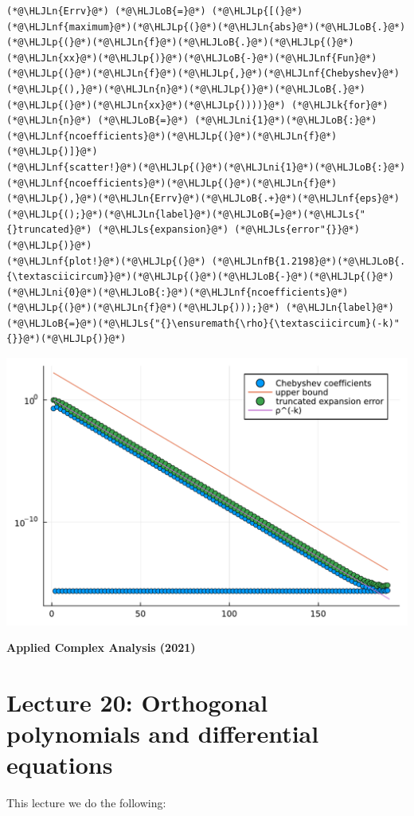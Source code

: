 \documentclass[12pt,a4paper]{article}
\newcommand{\HLJLk}[1]{\textcolor[RGB]{148,91,176}{\textbf{#1}}}
\newcommand{\HLJLn}[1]{#1}
\newcommand{\HLJLnf}[1]{\textcolor[RGB]{66,102,213}{#1}}
\newcommand{\HLJLs}[1]{\textcolor[RGB]{201,61,57}{#1}}
\newcommand{\HLJLnfB}[1]{\textcolor[RGB]{59,151,46}{#1}}
\newcommand{\HLJLni}[1]{\textcolor[RGB]{59,151,46}{#1}}
\newcommand{\HLJLoB}[1]{\textcolor[RGB]{102,102,102}{\textbf{#1}}}
\newcommand{\HLJLp}[1]{#1}
\begin{document}
\begin{lstlisting}
(*@\HLJLn{Errv}@*) (*@\HLJLoB{=}@*) (*@\HLJLp{[(}@*)(*@\HLJLnf{maximum}@*)(*@\HLJLp{(}@*)(*@\HLJLn{abs}@*)(*@\HLJLoB{.}@*)(*@\HLJLp{(}@*)(*@\HLJLn{f}@*)(*@\HLJLoB{.}@*)(*@\HLJLp{(}@*)(*@\HLJLn{xx}@*)(*@\HLJLp{)}@*)(*@\HLJLoB{-}@*)(*@\HLJLnf{Fun}@*)(*@\HLJLp{(}@*)(*@\HLJLn{f}@*)(*@\HLJLp{,}@*)(*@\HLJLnf{Chebyshev}@*)(*@\HLJLp{(),}@*)(*@\HLJLn{n}@*)(*@\HLJLp{)}@*)(*@\HLJLoB{.}@*)(*@\HLJLp{(}@*)(*@\HLJLn{xx}@*)(*@\HLJLp{))))}@*) (*@\HLJLk{for}@*) (*@\HLJLn{n}@*) (*@\HLJLoB{=}@*) (*@\HLJLni{1}@*)(*@\HLJLoB{:}@*)(*@\HLJLnf{ncoefficients}@*)(*@\HLJLp{(}@*)(*@\HLJLn{f}@*)(*@\HLJLp{)]}@*)
(*@\HLJLnf{scatter!}@*)(*@\HLJLp{(}@*)(*@\HLJLni{1}@*)(*@\HLJLoB{:}@*)(*@\HLJLnf{ncoefficients}@*)(*@\HLJLp{(}@*)(*@\HLJLn{f}@*)(*@\HLJLp{),}@*)(*@\HLJLn{Errv}@*)(*@\HLJLoB{.+}@*)(*@\HLJLnf{eps}@*)(*@\HLJLp{();}@*)(*@\HLJLn{label}@*)(*@\HLJLoB{=}@*)(*@\HLJLs{"{}truncated}@*) (*@\HLJLs{expansion}@*) (*@\HLJLs{error"{}}@*)(*@\HLJLp{)}@*)
(*@\HLJLnf{plot!}@*)(*@\HLJLp{(}@*) (*@\HLJLnfB{1.2198}@*)(*@\HLJLoB{.{\textasciicircum}}@*)(*@\HLJLp{(}@*)(*@\HLJLoB{-}@*)(*@\HLJLp{(}@*)(*@\HLJLni{0}@*)(*@\HLJLoB{:}@*)(*@\HLJLnf{ncoefficients}@*)(*@\HLJLp{(}@*)(*@\HLJLn{f}@*)(*@\HLJLp{)));}@*) (*@\HLJLn{label}@*)(*@\HLJLoB{=}@*)(*@\HLJLs{"{}\ensuremath{\rho}{\textasciicircum}(-k)"{}}@*)(*@\HLJLp{)}@*)
\end{lstlisting}

\includegraphics[width=\linewidth]{jl_dOthw0/OP_methods_28_1.pdf}

\textbf{Applied Complex Analysis (2021)}

\section{Lecture 20: Orthogonal polynomials and differential equations}
This lecture we do the following:
\end{document}
